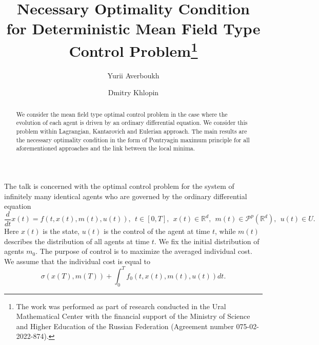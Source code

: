 \documentclass[12pt]{llncs}
\newcommand{\rd}{\mathbb{R}^d}
\newcommand{\prd}{\mathcal{P}^p(\rd)}
\begin{document}
%
\fi

\title{Necessary Optimality Condition\\ for Deterministic Mean Field Type Control Problem\thanks{The work was performed as part of research conducted
		in the Ural Mathematical Center with the financial support
		of the Ministry of Science and Higher Education of the Russian Federation
		(Agreement number 075-02-2022-874).}}
\author{Yurii Averboukh 
  \and
  Dmitry Khlopin 
}

\maketitle

\begin{abstract}
We consider the mean field type optimal control problem in the case where the evolution of each agent is driven by an ordinary differential equation. We consider this problem within Lagrangian, Kantarovich and Eulerian approach. The main results are the necessary optimality condition in the form of Pontryagin maximum principle for all aforementioned approaches and the link between the local minima.

\end{abstract}

The talk is concerned with the optimal control problem for the system of infinitely many identical agents who are governed by the ordinary differential equation
\begin{equation*}\label{eq:system}
	\frac{d}{dt}x(t)=f(t,x(t),m(t),u(t)),\ \ t\in [0,T],\ \ x(t)\in\rd, \ \ m(t)\in\prd,\ \ u(t)\in U. 
\end{equation*} Here $x(t)$ is the state,  $u(t)$ is the control of the agent at time $t$, while $m(t)$ describes the distribution of all agents at time $t$. We fix the initial distribution of agents $m_0$. The purpose of control is to maximize the averaged  individual cost. We assume that the individual cost is equal to
\begin{equation*}\label{system:payoff}
	\sigma(x(T),m(T))+\int_0^Tf_0(t,x(t),m(t),u(t))dt.
\end{equation*} 
\end{document}
